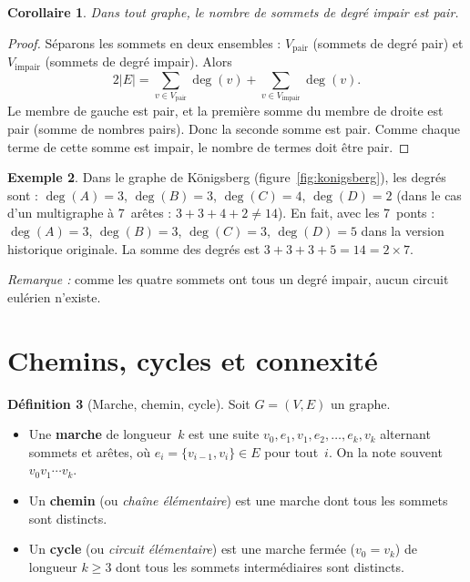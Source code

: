 \documentclass[12pt,a4paper,openany]{book}
\theoremstyle{definition}
\newtheorem{definition}{Définition}[chapter]
\newtheorem{exemple}[definition]{Exemple}
\theoremstyle{plain}
\newtheorem{corollaire}[definition]{Corollaire}
\theoremstyle{remark}
\newcommand{\abs}[1]{\left|#1\right|}
\begin{document}
\begin{corollaire}
\label{cor:degre-pair}
Dans tout graphe, le nombre de sommets de degré impair est pair.
\end{corollaire}

\begin{proof}
Séparons les sommets en deux ensembles : $V_{\text{pair}}$ (sommets de degré
pair) et $V_{\text{impair}}$ (sommets de degré impair). Alors
\[
  2\abs{E} = \sum_{v \in V_{\text{pair}}} \deg(v)
  + \sum_{v \in V_{\text{impair}}} \deg(v).
\]
Le membre de gauche est pair, et la première somme du membre de droite est pair
(somme de nombres pairs). Donc la seconde somme est pair. Comme chaque terme de
cette somme est impair, le nombre de termes doit être pair.
\end{proof}

\begin{exemple}
\label{ex:degre}
Dans le graphe de Königsberg (figure~\ref{fig:konigsberg}), les degrés sont :
$\deg(A) = 3$, $\deg(B) = 3$, $\deg(C) = 4$, $\deg(D) = 2$ (dans le cas d'un
multigraphe à 7~arêtes : $3+3+4+2 \neq 14$). En fait, avec les 7~ponts :
$\deg(A) = 3$, $\deg(B) = 3$, $\deg(C) = 3$, $\deg(D) = 5$ dans la version
historique originale. La somme des degrés est $3+3+3+5 = 14 = 2 \times 7$.

\emph{Remarque :} comme les quatre sommets ont tous un degré impair, aucun
circuit eulérien n'existe.
\end{exemple}

\section{Chemins, cycles et connexité}
\label{sec:chemins}

\begin{definition}[Marche, chemin, cycle]
\label{def:marche-chemin-cycle}
Soit $G = (V, E)$ un graphe.
\begin{itemize}
  \item Une \textbf{marche} de longueur~$k$ est une suite
    $v_0, e_1, v_1, e_2, \ldots, e_k, v_k$ alternant sommets et arêtes, où
    $e_i = \{v_{i-1}, v_i\} \in E$ pour tout~$i$. On la note souvent
    $v_0 v_1 \cdots v_k$.
  \item Un \textbf{chemin} (ou \emph{chaîne élémentaire}) est une marche dont
    tous les sommets sont distincts.
  \item Un \textbf{cycle} (ou \emph{circuit élémentaire}) est une marche fermée
    ($v_0 = v_k$) de longueur $k \geq 3$ dont tous les sommets intermédiaires
    sont distincts.
\end{itemize}
\end{definition}
\end{document}
